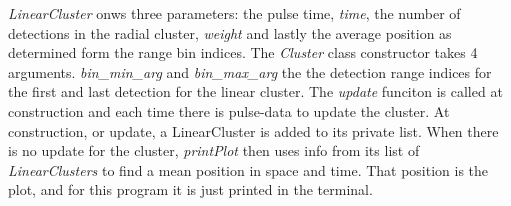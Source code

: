 \documentclass[letterpaper]{book}
\begin{document}
\textit{LinearCluster} onws three parameters: the pulse time, \textit{time}, the number of detections in the radial cluster, \textit{weight} and lastly the average position as determined form the range bin indices. The \textit{Cluster} class constructor takes 4 arguments. \textit{bin\_min\_arg} and \textit{bin\_max\_arg} the the detection range indices for the first and last detection for the linear cluster. The \textit{update} funciton is called at construction and each time there is pulse-data to update the cluster. At construction, or update, a LinearCluster is added to its private list. When there is no update for the cluster, \textit{printPlot} then uses info from its list of \textit{LinearClusters} to find a mean position in space and time. That position is the plot, and for this program it is just printed in the terminal. 
\end{document}
